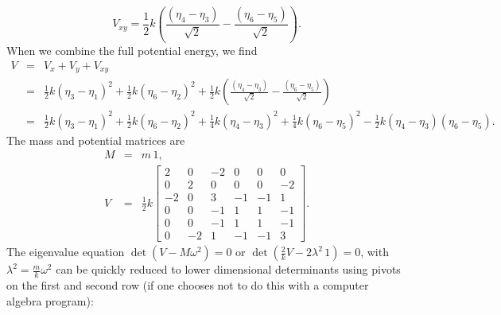 \documentclass[letterpaper,11pt]{article}
\begin{document}
\begin{equation*}
 V_{xy} = \frac{1}{2} k \left( \frac{(\eta_4 - \eta_3)}{\sqrt{2}} - \frac{(\eta_6 - \eta_5)}{\sqrt{2}} \right).
\end{equation*}
When we combine the full potential energy, we find
\begin{eqnarray*}
 V & = & V_x + V_y + V_{xy} \\
 & = & \frac{1}{2} k (\eta_3 - \eta_1)^2 + \frac{1}{2} k (\eta_6 - \eta_2)^2 + \frac{1}{2} k \left( \frac{(\eta_4 - \eta_3)}{\sqrt{2}} - \frac{(\eta_6 - \eta_5)}{\sqrt{2}} \right) \\
 & = & \frac{1}{2} k (\eta_3 - \eta_1)^2 + \frac{1}{2} k (\eta_6 - \eta_2)^2 + \frac{1}{4} k (\eta_4 - \eta_3)^2 + \frac{1}{4} k (\eta_6 - \eta_5)^2 - \frac{1}{2} k (\eta_4 - \eta_3) (\eta_6 - \eta_5).
\end{eqnarray*}
The mass and potential matrices are
\begin{eqnarray*}
 M & = & m\,1, \\
 V & = & \frac{1}{2} k \left[ \begin{array}{cccccc}
 2 & 0 & -2 & 0 & 0 & 0 \\
 0 & 2 & 0 & 0 & 0 & -2 \\
 -2 & 0 & 3 & -1 & -1 & 1 \\
 0 & 0 & -1 & 1 & 1 & -1 \\
 0 & 0 & -1 & 1 & 1 & -1 \\
 0 & -2 & 1 & -1 & -1 & 3
 \end{array} \right].
\end{eqnarray*}
The eigenvalue equation $\det(V - M\omega^2) = 0$ or $\det(\frac{2}{k} V - 2 \lambda^2\,1) = 0$, with $\lambda^2 =  \frac{m}{k} \omega^2$ can be quickly reduced to lower dimensional determinants using pivots on the first and second row (if one chooses not to do this with a computer algebra program):
\end{document}
